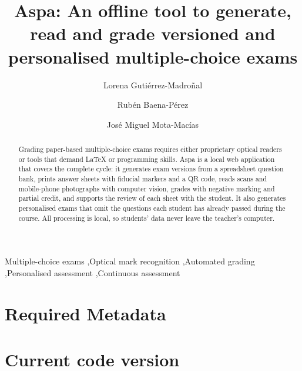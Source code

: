 \documentclass[preprint,12pt, a4paper]{elsarticle}
\begin{document}
\renewcommand{\labelenumii}{\arabic{enumi}.\arabic{enumii}}

\begin{frontmatter}

\title{Aspa: An offline tool to generate, read and grade versioned and personalised multiple-choice exams}

\author[uca]{Lorena Gutiérrez-Madroñal}
\author[uca]{Rubén Baena-Pérez}
\author[uca]{José Miguel Mota-Macías}

\address[uca]{Department of Computer Science and Engineering, School of Engineering, University of Cádiz, Avda.\ de la Universidad de Cádiz 10, 11519 Puerto Real, Cádiz, Spain}

\begin{abstract}
Grading paper-based multiple-choice exams requires either proprietary optical readers or tools that demand \LaTeX{} or programming skills. Aspa is a local web application that covers the complete cycle: it generates exam versions from a spreadsheet question bank, prints answer sheets with fiducial markers and a QR code, reads scans and mobile-phone photographs with computer vision, grades with negative marking and partial credit, and supports the review of each sheet with the student. It also generates personalised exams that omit the questions each student has already passed during the course. All processing is local, so students' data never leave the teacher's computer.
\end{abstract}

\begin{keyword}
Multiple-choice exams \sep Optical mark recognition \sep Automated grading \sep Personalised assessment \sep Continuous assessment
\end{keyword}

\end{frontmatter}


\section*{Required Metadata}
\label{sec:metadata}

\section*{Current code version}
\label{sec:codeversion}
\end{document}
